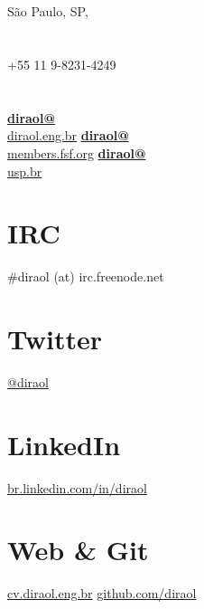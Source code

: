 \documentclass[]{friggeri-cv}
\begin{document}
\thispagestyle{empty}
%
%


\begin{aside}
  \section{}
    São Paulo, SP, 
    ~
  \section{}
    +55 11 9-8231-4249
    ~
  \section{}
    \href{mailto:diraol@diraol.eng.br}{\textbf{diraol@}\\diraol.eng.br}
    \href{mailto:diraol@members.fsf.org}{\textbf{diraol@}\\members.fsf.org}
    \href{mailto:diraol@usp.br}{\textbf{diraol@}\\usp.br}
    ~
  \section{IRC}
    \#diraol (at) irc.freenode.net
    ~
  \section{Twitter}
    \href{http://twitter.com/diraol}{@diraol}
    ~
  \section{LinkedIn}
    \href{http://br.linkedin.com/in/diraol}{br.linkedin.com/in/diraol}
    ~
  \section{Web \& Git}
    \href{http://cv.diraol.eng.br}{cv.diraol.eng.br}
    \href{https://github.com/diraol}{github.com/diraol}
    ~

\end{aside}
\end{document}
